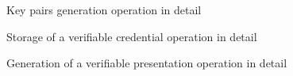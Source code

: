 \begin{figure}[!h]
    \centering
    
    \caption{Key pairs generation operation in detail}
    \label{poc-gen-keys}
\end{figure}

\begin{figure}[!h]
    \centering
    
    \caption{Storage of a verifiable credential operation in detail}
    \label{poc-store-vc}
\end{figure}

\begin{figure}[!h]
    \centering
    
    \caption{Generation of a verifiable presentation operation in detail}
    \label{poc-get-vp}
\end{figure}